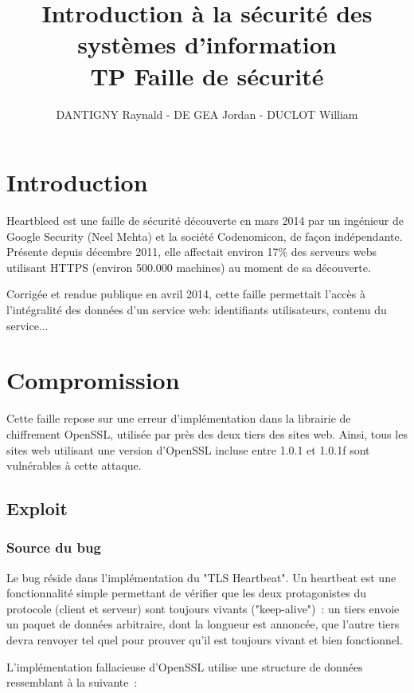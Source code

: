 \documentclass[a4paper,oneside,1pt]{article}
\title{\Huge{Introduction à la sécurité des systèmes d'information}\\
TP Faille de sécurité}
\author{DANTIGNY Raynald - DE GEA Jordan - DUCLOT William}
\begin{document}
\maketitle

\section{Introduction}
Heartbleed est une faille de sécurité découverte en mars 2014 par un ingénieur de Google Security (Neel Mehta) et la société Codenomicon, de façon indépendante. Présente depuis décembre 2011, elle affectait environ 17\% des serveurs webs utilisant HTTPS (environ 500.000 machines) au moment de sa découverte.

Corrigée et rendue publique en avril 2014, cette faille permettait l'accès à l'intégralité des données d'un service web: identifiants utilisateurs, contenu du service...

\section{Compromission}
Cette faille repose sur une erreur d'implémentation dans la librairie de chiffrement OpenSSL, utilisée par près des deux tiers des sites web. Ainsi, tous les sites web utilisant une version d'OpenSSL incluse entre 1.0.1 et 1.0.1f sont vulnérables à cette attaque.

\subsection{Exploit}
\subsubsection{Source du bug}
Le bug réside dans l'implémentation du "TLS Heartbeat". Un heartbeat est une fonctionnalité simple permettant de vérifier que les deux protagonistes du protocole (client et serveur) sont toujours vivants ("keep-alive")~: un tiers envoie un paquet de données arbitraire, dont la longueur est annoncée, que l'autre tiers devra renvoyer tel quel pour prouver qu'il est toujours vivant et bien fonctionnel.

L'implémentation fallacieuse d'OpenSSL utilise une structure de données ressemblant à la suivante~:
\end{document}
